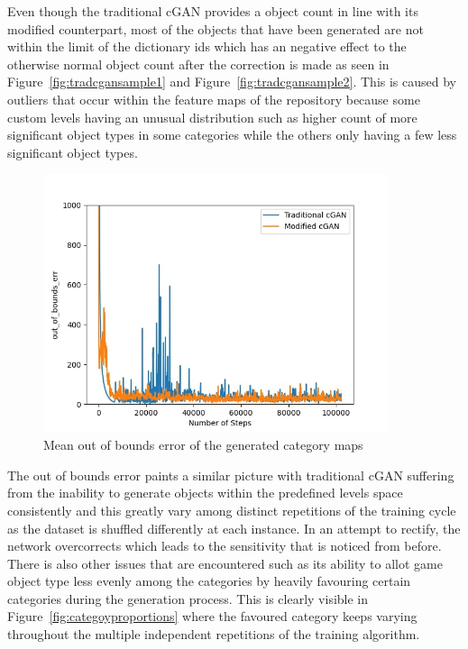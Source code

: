 \documentclass{Configuration_Files/PoliMi3i_thesis}
\begin{document}
Even though the traditional cGAN provides a object count in line with its modified 
counterpart, most of the objects that have been generated are not within the limit of 
the dictionary ids which has an negative effect to the otherwise normal object count
after the correction is made as seen in Figure~\ref{fig:tradcgansample1} and 
Figure~\ref{fig:tradcgansample2}. This is caused by outliers that occur within the feature 
maps of the repository because some custom levels having an unusual distribution such 
as higher count of more significant object types in some categories while the others 
only having a few less significant object types.
\begin{figure}[H]
    \centering
    \includegraphics[width=0.9\textwidth]{oob_err.jpg}
    \caption{Mean out of bounds error of the generated category maps}
    \label{fig:ooberror}
\end{figure}
The out of bounds error paints a similar picture with traditional cGAN suffering from 
the inability to generate objects within the predefined levels space consistently and 
this greatly vary among distinct repetitions of the training cycle as the dataset is 
shuffled differently at each instance. In an attempt to rectify, the network 
overcorrects which leads to the sensitivity that is noticed from before. There is also 
other issues that are encountered such as its ability to allot game object type less
evenly among the categories by heavily favouring certain categories during the 
generation process. This is clearly visible in Figure~\ref{fig:categoyproportions} where the favoured category 
keeps varying throughout the multiple independent repetitions of the training algorithm.
\newpage
\end{document}
